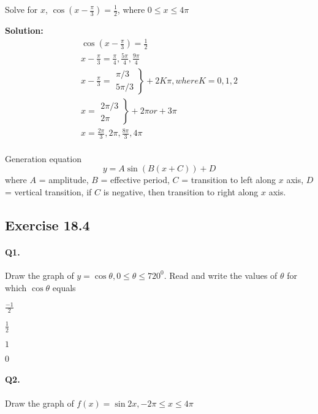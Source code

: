 \documentclass{article}
\begin{document}
Solve for $x$, $\cos(x-\frac{\pi}{3}) = \frac{1}{2}$, where $0 \leq x \leq 4\pi$

{\scriptsize \textbf{Solution:}}
\[
  \begin{aligned}
    \cos(x-\frac{\pi}{3}) = \frac{1}{2} \\
    x - \frac{\pi}{3} = \frac{\pi}{4}, \frac{5\pi}{4}, \frac{9\pi}{4} \\
    x - \frac{\pi}{3} = \left. \begin{array}{c} \pi/3 \\ 5\pi/3 \end{array} \right\} + 2K\pi, where K = 0, 1, 2 \\
    x = \left. \begin{array}{c} 2\pi/3 \\ 2\pi \end{array} \right\} + 2\pi or + 3\pi \\
    x = \frac{2\pi}{3}, 2\pi, \frac{8\pi}{3}, 4\pi
  \end{aligned}
\]

\paragraph{}

Generation equation \[ y = A \sin(B(x + C)) + D \] where $A$ = amplitude, $B$ = effective period, $C$ = transition to left along $x$ axis, $D$ = vertical transition, if $C$ is negative, then transition to right along $x$ axis.

\subsection {Exercise 18.4}
\paragraph{Q1.}
Draw the graph of $y=\cos\theta, 0 \leq \theta \leq 720^{0}$.
Read and write the values of $\theta$ for which $\cos\theta$ equals

\begin{enumerate*}[label=\alph*)]
  \item $\frac{-1}{2}$
  \item $\frac{1}{2}$
  \item $1$
  \item $0$
\end{enumerate*}

\paragraph{Q2.}
Draw the graph of $f(x)=\sin 2x, -2\pi \leq x \leq 4\pi$
\end{document}
